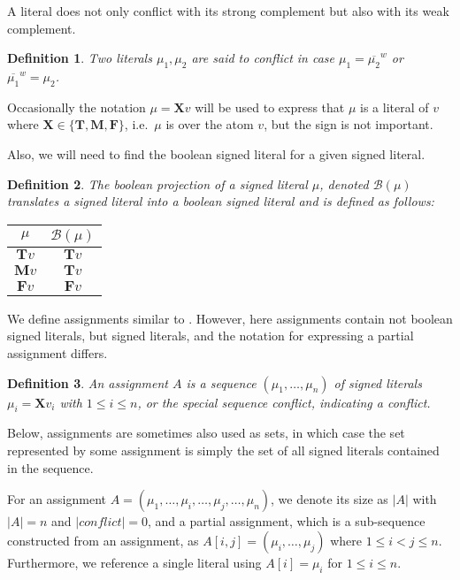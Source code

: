 \documentclass{vutinfth} %
\newtheorem{definition}{Definition}[chapter]
\newtheorem*{remark}{Remark}
\newcommand{\negweak}[1]{\overline{#1}^w}
\newcommand{\bass}{\mathcal{B}}
\newcommand{\ass}{A}
\newcommand{\bT}{\mathbf{T}}
\newcommand{\bM}{\mathbf{M}}
\newcommand{\bF}{\mathbf{F}}
\newcommand{\bX}{\mathbf{X}}
\newcommand{\sgl}{\mu}
\newcommand{\thrice}{{\{\bT, \bM, \bF \}}}
\begin{document}
A literal does not only conflict with its strong complement but also with its weak complement.

\begin{definition}
Two literals $\sgl_1, \sgl_2$ are said to \emph{conflict} in case $\sgl_1 = \negweak{\sgl_2}$ or $\negweak{\sgl_1} = \sgl_2$.
\end{definition}

Occasionally the notation $\sgl = \bX v$ will be used to express that $\sgl$ is a literal of $v$ where $\bX \in \thrice$, i.e.~$\sgl$ is over the atom $v$, but the sign is not important.

Also, we will need to find the boolean signed literal for a given signed literal.

\begin{definition}
The \emph{boolean projection} of a signed literal $\sgl$, denoted $\bass(\sgl)$ translates a signed literal into a boolean signed literal and is defined as follows:

\begin{center}
\begin{tabular}{|c|c|}
\hline
$\sgl$&$\bass(\sgl)$\\
\hline
\hline
$\bT v$&$\bT v$\\
$\bM v$&$\bT v$\\
$\bF v$&$\bF v$\\
\hline
\end{tabular}
\end{center}
\end{definition}

We define assignments similar to \cite[Section 2, p.~3]{clasp}. However, here assignments contain not boolean signed literals, but signed literals, and the notation for expressing a partial assignment differs.

\begin{definition}
An \emph{assignment} $\ass$ is a sequence $(\sgl_1, \ldots, \sgl_n)$ of signed literals $\sgl_i = \bX v_i$ with $1 \leq i \leq n$, or the special sequence \emph{conflict}, indicating a conflict.
\end{definition}

Below, assignments are sometimes also used as sets, in which case the set represented by some assignment is simply the set of all signed literals contained in the sequence.

For an assignment $\ass = (\sgl_1, \ldots, \sgl_i, \ldots, \sgl_j, \ldots, \sgl_n)$, we denote its size as $|\ass|$ with $|\ass| = n$ and $|conflict| = 0$, and a partial assignment, which is a sub-sequence constructed from an assignment, as $\ass[i,j] = (\sgl_i, \ldots, \sgl_j)$ where $1 \leq i < j \leq n$. Furthermore, we reference a single literal using $A[i] = \sgl_i$ for $1 \leq i \leq n$.
\end{document}
